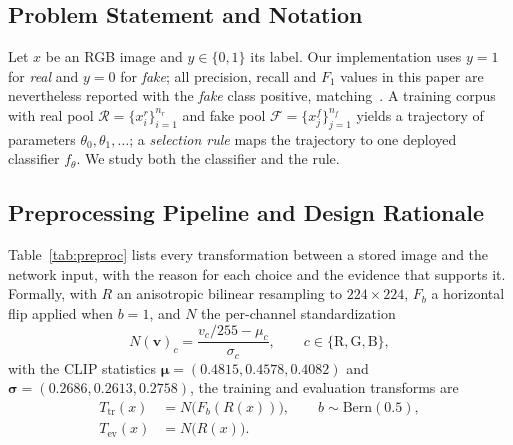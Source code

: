 \documentclass[10pt,journal]{IEEEtran}
\newcommand{\vect}[1]{\boldsymbol{#1}}
\begin{document}
\subsection{Problem Statement and Notation}
Let $x$ be an RGB image and $y\in\{0,1\}$ its label. Our implementation uses
$y=1$ for \emph{real} and $y=0$ for \emph{fake}; all precision, recall and
$F_1$ values in this paper are nevertheless reported with the \emph{fake}
class positive, matching~\cite{bhattacharjee2026caenet}. A training corpus with
real pool $\mathcal{R}=\{x^r_i\}_{i=1}^{n_r}$ and fake pool
$\mathcal{F}=\{x^f_j\}_{j=1}^{n_f}$ yields a trajectory of parameters
$\theta_0,\theta_1,\dots$; a \emph{selection rule} maps the trajectory to one
deployed classifier $f_\theta$. We study both the classifier and the rule.

\subsection{Preprocessing Pipeline and Design Rationale}\label{sec:preproc}
Table~\ref{tab:preproc} lists every transformation between a stored image and
the network input, with the reason for each choice and the evidence that
supports it. Formally, with $R$ an anisotropic bilinear resampling to
$224\times224$, $F_b$ a horizontal flip applied when $b=1$, and $N$ the
per-channel standardization
\begin{equation}
N(\vect{v})_c=\frac{v_c/255-\mu_c}{\sigma_c},\qquad c\in\{\mathrm{R},\mathrm{G},\mathrm{B}\},
\label{eq:norm}
\end{equation}
with the CLIP statistics $\vect{\mu}=(0.4815,0.4578,0.4082)$ and
$\vect{\sigma}=(0.2686,0.2613,0.2758)$, the training and evaluation transforms
are
\begin{align}
T_{\mathrm{tr}}(x)&=N\big(F_b(R(x))\big),\qquad b\sim\mathrm{Bern}(0.5),
\label{eq:transforms}\\
T_{\mathrm{ev}}(x)&=N\big(R(x)\big).
\end{align}
\end{document}
